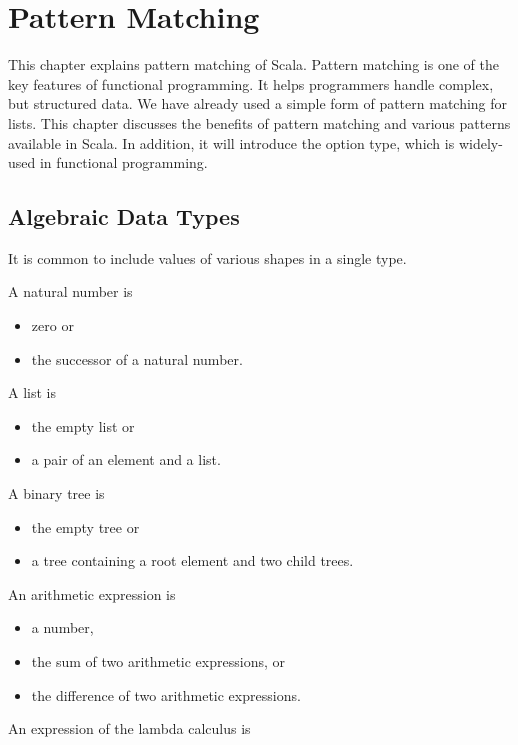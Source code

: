 \chapter{Pattern Matching}

This chapter explains pattern matching of Scala.
Pattern matching is one of the key features of functional programming.
It helps programmers handle complex, but structured data.
We have already used a simple form of pattern matching for lists.
This chapter discusses the benefits
of pattern matching and various patterns available in Scala.
In addition, it will introduce the option type, which is widely-used in
functional programming.

\section{Algebraic Data Types}

It is common to include values of various shapes in a single type.

A natural number is

\begin{itemize}
\item zero or
\item the successor of a natural number.
\end{itemize}

A list is

\begin{itemize}
\item the empty list or
\item a pair of an element and a list.
\end{itemize}

A binary tree is

\begin{itemize}
\item the empty tree or
\item a tree containing a root element and two child trees.
\end{itemize}

An arithmetic expression is

\begin{itemize}
\item a number,
\item the sum of two arithmetic expressions, or
\item the difference of two arithmetic expressions.
\end{itemize}

An expression of the lambda calculus is

